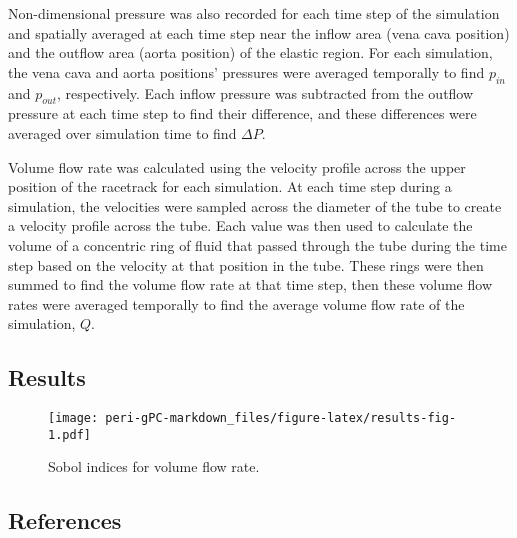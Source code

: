 \documentclass[
]{article}
\begin{document}
Non-dimensional pressure was also recorded for each time step of the
simulation and spatially averaged at each time step near the inflow area
(vena cava position) and the outflow area (aorta position) of the
elastic region. For each simulation, the vena cava and aorta positions'
pressures were averaged temporally to find \(p_{in}\) and \(p_{out}\),
respectively. Each inflow pressure was subtracted from the outflow
pressure at each time step to find their difference, and these
differences were averaged over simulation time to find \(\Delta P\).

Volume flow rate was calculated using the velocity profile across the
upper position of the racetrack for each simulation. At each time step
during a simulation, the velocities were sampled across the diameter of
the tube to create a velocity profile across the tube. Each value was
then used to calculate the volume of a concentric ring of fluid that
passed through the tube during the time step based on the velocity at
that position in the tube. These rings were then summed to find the
volume flow rate at that time step, then these volume flow rates were
averaged temporally to find the average volume flow rate of the
simulation, \(Q\).

\hypertarget{results}{%
\subsection{Results}\label{results}}

\begin{figure}
\centering
\texttt{[image: peri-gPC-markdown\_files/figure-latex/results-fig-1.pdf]}
\caption{Sobol indices for volume flow rate.}
\end{figure}

\hypertarget{references}{%
\subsection*{References}\label{references}}
\end{document}
